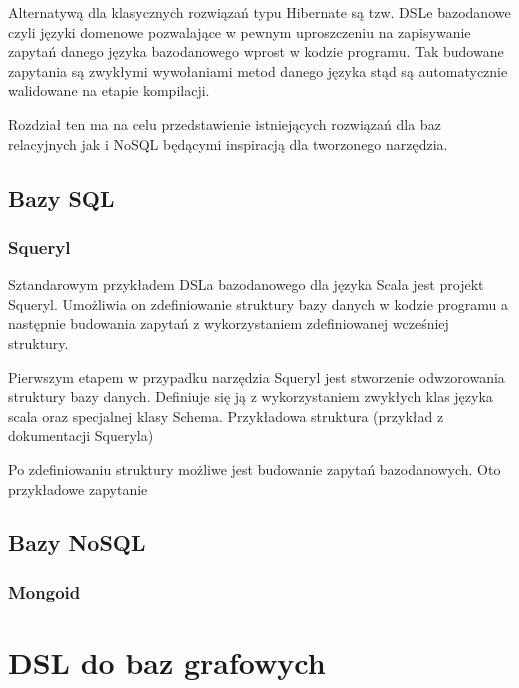\documentclass[brudnopis]{xmgr}
\begin{document}
Alternatywą dla klasycznych rozwiązań typu Hibernate są tzw. DSLe bazodanowe czyli języki domenowe pozwalające w pewnym uproszczeniu na zapisywanie zapytań danego języka bazodanowego wprost w kodzie programu. Tak budowane zapytania są zwykłymi wywołaniami metod danego języka stąd są automatycznie walidowane na etapie kompilacji.

Rozdział ten ma na celu przedstawienie istniejących rozwiązań dla baz relacyjnych jak i NoSQL będącymi inspiracją dla tworzonego narzędzia.

\section{Bazy SQL}

\subsection{Squeryl}

Sztandarowym przykładem DSLa bazodanowego dla języka Scala jest projekt Squeryl. Umożliwia on zdefiniowanie struktury bazy danych w kodzie programu a następnie budowania zapytań z wykorzystaniem zdefiniowanej wcześniej struktury.

Pierwszym etapem w przypadku narzędzia Squeryl jest stworzenie odwzorowania struktury bazy danych. Definiuje się ją z wykorzystaniem zwykłych klas języka scala oraz specjalnej klasy Schema. Przykładowa struktura (przykład z dokumentacji Squeryla)



Po zdefiniowaniu struktury możliwe jest budowanie zapytań bazodanowych. Oto przykładowe zapytanie 



\section{Bazy NoSQL}

\subsection{Mongoid}

\chapter{DSL do baz grafowych}
\end{document}
